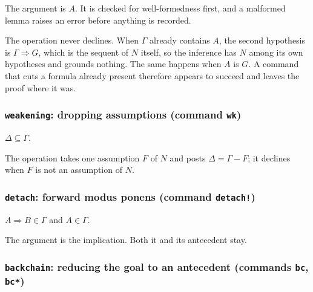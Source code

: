 The argument is $A$.  It is checked for well-formedness first, and a
malformed lemma raises an error before anything is recorded.

\begin{remark}
The operation never declines.  When $\Gamma$ already contains $A$, the
second hypothesis is $\Gamma \Longrightarrow G$, which is the sequent of
$N$ itself, so the inference has $N$ among its own hypotheses and
grounds nothing.  The same happens when $A$ is $G$.  A command that cuts
a formula already present therefore appears to succeed and leaves the
proof where it was.
\end{remark}

\subsubsection*{\texttt{weakening}: dropping assumptions (command \texttt{wk})}

\label{kop:weakening}%
\begin{VNBcond}
\item[Inclusion] $\Delta \subseteq \Gamma$.
\end{VNBcond}
The operation takes one assumption $F$ of $N$ and posts
$\Delta = \Gamma - F$; it declines when $F$ is not an assumption of $N$.

\subsubsection*{\texttt{detach}: forward modus ponens (command \texttt{detach!})}

\label{kop:detach}%
\begin{VNBcond}
\item[Assumption] $A \Rightarrow B \in \Gamma$ and $A \in \Gamma$.
\end{VNBcond}
The argument is the implication.  Both it and its antecedent stay.

\subsubsection*{\texttt{backchain}: reducing the goal to an antecedent
  (commands \texttt{bc}, \texttt{bc*})}

